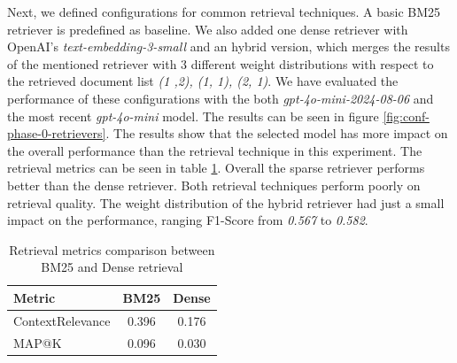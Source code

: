Next, we defined configurations for common retrieval techniques. A basic BM25 retriever is predefined as baseline. We also added one dense retriever with OpenAI's \textit{text-embedding-3-small}\cite{OpenAI_2022} and an hybrid version, which merges the results of the mentioned retriever with 3 different weight distributions with respect to the retrieved document list \textit{(1 ,2), (1, 1), (2, 1)}. We have evaluated the performance of these configurations with the both \textit{gpt-4o-mini-2024-08-06} and the most recent \textit{gpt-4o-mini} model. The results can be seen in figure \ref{fig:conf-phase-0-retrievers}. The results show that the selected model has more impact on the overall performance than the retrieval technique in this experiment. The retrieval metrics can be seen in table \ref{tab:retrieval_metrics}. Overall the sparse retriever performs better than the dense retriever. Both retrieval techniques perform poorly on retrieval quality. The weight distribution of the hybrid retriever had just a small impact on the performance, ranging F1-Score from \textit{0.567} to \textit{0.582}.

\begin{table}[h]
    \centering
    \begin{tabular}{|l|c|c|}
        \hline
        \textbf{Metric} & \textbf{BM25} & \textbf{Dense} \\
        \hline
        ContextRelevance & 0.396 & 0.176 \\
        MAP@K & 0.096 & 0.030 \\
        \hline
    \end{tabular}
    \caption{Retrieval metrics comparison between BM25 and Dense retrieval}
    \label{tab:retrieval_metrics}
\end{table}

